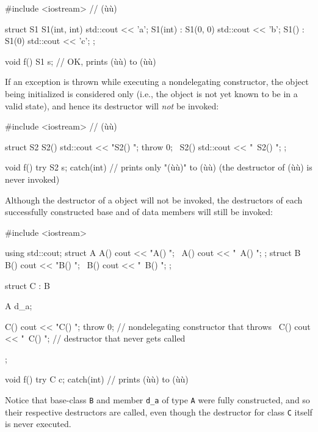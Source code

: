 \begin{emcppslisting}[language=C++]
#include <iostream>  // (ù{}ù)

struct S1
{
    S1(int, int)            { std::cout << 'a'; }
    S1(int)      : S1(0, 0) { std::cout << 'b'; }
    S1()         : S1(0)    { std::cout << 'c'; }
};

void f()
{
    S1 s;  // OK, prints (ù{}ù) to (ù{}ù)
}
\end{emcppslisting}

\noindent If an exception is thrown while executing a nondelegating constructor,
the object being initialized is considered only  (i.e., the object is not yet known to be in a valid state),
and hence its destructor will \emph{not} be
invoked:

\begin{emcppslisting}[language=C++]
#include <iostream>  // (ù{}ù)

struct S2
{
    S2()  { std::cout << "S2() ";  throw 0; }
    ~S2() { std::cout << "~S2() ";          }
};

void f() try { S2 s; } catch(int) { }
    // prints only "(ù{}ù)" to (ù{}ù) (the destructor of (ù{}ù) is never invoked)
\end{emcppslisting}

\noindent Although the destructor of a  object will not be invoked, the destructors of
each successfully constructed base and of data members will still be
invoked:

\begin{emcppslisting}[language=C++]
#include <iostream>

using std::cout;
struct A { A() { cout << "A() "; } ~A() { cout << "~A() "; } };
struct B { B() { cout << "B() "; } ~B() { cout << "~B() "; } };

struct C : B
{
    A d_a;

    C()  { cout << "C() "; throw 0; }  // nondelegating constructor that throws
    ~C() { cout << "~C() ";         }  // destructor that never gets called
};

void f() try { C c; } catch(int) { }
    // prints (ù{}ù) to (ù{}ù)
\end{emcppslisting}

\noindent Notice that base-class \lstinline!B! and member \lstinline!d_a! of type
\lstinline!A! were fully constructed, and so their respective destructors
are called, even though the destructor for class \lstinline!C! itself is
  never \mbox{executed}.

